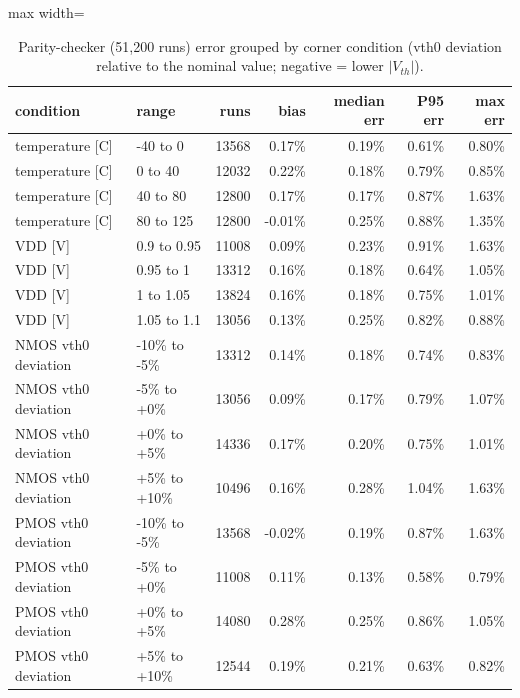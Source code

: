 \begin{table}[H]
\centering
{\small
\begin{adjustbox}{max width=\linewidth}
\begin{tabular}{llrrrrr}
\toprule
condition & range & runs & bias & median err & P95 err & max err \\
\midrule
temperature [C] & -40 to 0 & 13568 & 0.17\% & 0.19\% & 0.61\% & 0.80\% \\
temperature [C] & 0 to 40 & 12032 & 0.22\% & 0.18\% & 0.79\% & 0.85\% \\
temperature [C] & 40 to 80 & 12800 & 0.17\% & 0.17\% & 0.87\% & 1.63\% \\
temperature [C] & 80 to 125 & 12800 & -0.01\% & 0.25\% & 0.88\% & 1.35\% \\
VDD [V] & 0.9 to 0.95 & 11008 & 0.09\% & 0.23\% & 0.91\% & 1.63\% \\
VDD [V] & 0.95 to 1 & 13312 & 0.16\% & 0.18\% & 0.64\% & 1.05\% \\
VDD [V] & 1 to 1.05 & 13824 & 0.16\% & 0.18\% & 0.75\% & 1.01\% \\
VDD [V] & 1.05 to 1.1 & 13056 & 0.13\% & 0.25\% & 0.82\% & 0.88\% \\
NMOS vth0 deviation & -10\% to -5\% & 13312 & 0.14\% & 0.18\% & 0.74\% & 0.83\% \\
NMOS vth0 deviation & -5\% to +0\% & 13056 & 0.09\% & 0.17\% & 0.79\% & 1.07\% \\
NMOS vth0 deviation & +0\% to +5\% & 14336 & 0.17\% & 0.20\% & 0.75\% & 1.01\% \\
NMOS vth0 deviation & +5\% to +10\% & 10496 & 0.16\% & 0.28\% & 1.04\% & 1.63\% \\
PMOS vth0 deviation & -10\% to -5\% & 13568 & -0.02\% & 0.19\% & 0.87\% & 1.63\% \\
PMOS vth0 deviation & -5\% to +0\% & 11008 & 0.11\% & 0.13\% & 0.58\% & 0.79\% \\
PMOS vth0 deviation & +0\% to +5\% & 14080 & 0.28\% & 0.25\% & 0.86\% & 1.05\% \\
PMOS vth0 deviation & +5\% to +10\% & 12544 & 0.19\% & 0.21\% & 0.63\% & 0.82\% \\
\bottomrule
\end{tabular}
\end{adjustbox}
}
\caption{Parity-checker (51{,}200 runs) error grouped by corner condition (vth0 deviation relative to the nominal value; negative = lower $|V_{th}|$).}
\label{tab:circuitcond}
\end{table}

